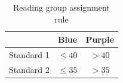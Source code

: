 \begin{table}[htbp]
  \centering
  \caption{Reading group assignment rule}
    \begin{tabular}{lcc}
    \toprule
    \toprule
          & Blue  & Purple \\
    \midrule
    Standard 1 & $\leq 40$ & $>40$ \\
    Standard 2 & $\leq 35$ & $>35$ \\
    \bottomrule
    \bottomrule
    \end{tabular}%
  \label{tab:assignment}%
\end{table}%